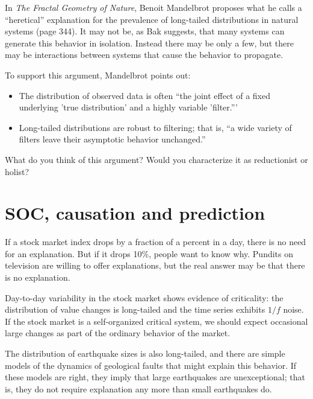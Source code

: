 \documentclass[10pt]{book}
\begin{document}
\begin{exercise}

In {\em The Fractal Geometry of Nature}, Benoit Mandelbrot proposes
what he calls a ``heretical'' explanation for the prevalence of
long-tailed distributions in natural systems (page 344).  It may not
be, as Bak suggests, that many systems can generate this behavior in
isolation.  Instead there may be only a few, but there may be
interactions between systems that cause the behavior to propagate.
  

To support this argument, Mandelbrot points out:

\begin{itemize}

\item The distribution of observed data is often ``the joint
  effect of a fixed underlying 'true distribution' and a highly
  variable 'filter.'''

\item Long-tailed distributions are robust to filtering; that is,
  ``a wide variety of filters leave their asymptotic behavior
  unchanged.''

\end{itemize}

What do you think of this argument?  Would you characterize
it as reductionist or holist?

\end{exercise}


\section{SOC, causation and prediction}

If a stock market index drops by a fraction of a percent in a
day, there is no need for an explanation.  But if it drops 10\%,
people want to know why.  Pundits
on television are willing to offer explanations, but the real
answer may be that there is no explanation.

Day-to-day variability in the stock market shows evidence of
criticality: the distribution of value changes is long-tailed
and the time series exhibits $1/f$ noise.
If the stock market is a self-organized critical system, we
should expect occasional large changes as part of the ordinary
behavior of the market.

The distribution of earthquake sizes is also long-tailed,
and there are simple models of the dynamics of geological faults
that might explain this behavior.  If these models are right,
they imply that large earthquakes are unexceptional; that is,
they do not require explanation any more than
small earthquakes do.
\end{document}
